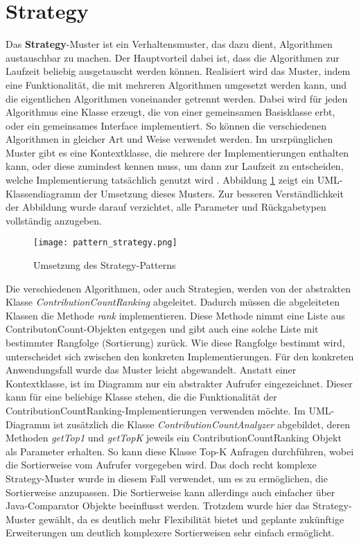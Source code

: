 \newpage
\section{Strategy}

Das \textbf{Strategy}-Muster ist ein Verhaltensmuster, das dazu dient, Algorithmen austauschbar zu machen.
Der Hauptvorteil dabei ist, dass die Algorithmen zur Laufzeit beliebig ausgetauscht werden können.
Realisiert wird das Muster, indem eine Funktionalität, die mit mehreren Algorithmen umgesetzt werden kann, und die eigentlichen Algorithmen voneinander getrennt werden.
Dabei wird für jeden Algorithmus eine Klasse erzeugt, die von einer gemeinsamen Basisklasse erbt, oder ein gemeinsames Interface implementiert.
So können die verschiedenen Algorithmen in gleicher Art und Weise verwendet werden.
Im ursrpünglichen Muster gibt es eine Kontextklasse, die mehrere der Implementierungen enthalten kann, oder diese zumindest kennen muss, um dann zur Laufzeit zu entscheiden, welche Implementierung tatsächlich genutzt wird \cite[pp.~343--351]{geirhos2015entwurfsmuster}.
\newline
Abbildung \ref{fig:pattern_strategy} zeigt ein UML-Klassendiagramm der Umsetzung dieses Musters.
Zur besseren Verständlichkeit der Abbildung wurde darauf verzichtet, alle Parameter und Rückgabetypen vollständig anzugeben.
\begin{figure}
    \texttt{[image: pattern\_strategy.png]}
    \centering
    \caption{Umsetzung des Strategy-Patterns}
    \label{fig:pattern_strategy}
\end{figure}
\newline
Die verschiedenen Algorithmen, oder auch Strategien, werden von der abstrakten Klasse \textit{ContributionCountRanking} abgeleitet.
Dadurch müssen die abgeleiteten Klassen die Methode \textit{rank} implementieren.
Diese Methode nimmt eine Liste aus ContributonCount-Objekten entgegen und gibt auch eine solche Liste mit bestimmter Rangfolge (Sortierung) zurück.
Wie diese Rangfolge bestimmt wird, unterscheidet sich zwischen den konkreten Implementierungen.
\newline
Für den konkreten Anwendungsfall wurde das Muster leicht abgewandelt.
Anstatt einer Kontextklasse, ist im Diagramm nur ein abstrakter Aufrufer eingezeichnet.
Dieser kann für eine beliebige Klasse stehen, die die Funktionalität der ContributionCountRanking-Implementierungen verwenden möchte.
Im UML-Diagramm ist zusätzlich die Klasse \textit{ContributionCountAnalyzer} abgebildet, deren Methoden \textit{getTop1} und \textit{getTopK} jeweils ein ContributionCountRanking Objekt als Parameter erhalten.
So kann diese Klasse Top-K Anfragen durchführen, wobei die Sortierweise vom Aufrufer vorgegeben wird.
\newline
\newline
Das doch recht komplexe Strategy-Muster wurde in diesem Fall verwendet, um es zu ermöglichen, die Sortierweise anzupassen.
Die Sortierweise kann allerdings auch einfacher über Java-Comparator Objekte beeinflusst werden.
Trotzdem wurde hier das Strategy-Muster gewählt, da es deutlich mehr Flexibilität bietet und geplante zukünftige Erweiterungen um deutlich komplexere Sortierweisen sehr einfach ermöglicht.
